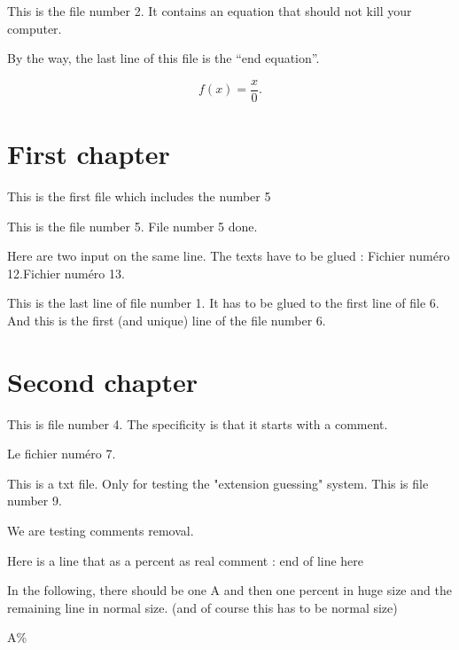 \documentclass[a4paper,oneside,11pt]{book}
\begin{document}
 

 


%
    This is the file number 2. It contains an equation that should not kill your computer.

By the way, the last line of this file is the ``end equation''.

\begin{equation}
    f(x)=\frac{ x }{ 0 }.
\end{equation}
  

\tableofcontents

\chapter{First chapter}
This is the first file which includes the number 5

This is the file number 5.      %
File number 5 done. 

Here are two input on the same line. The texts have to be glued :
Fichier numéro 12.Fichier numéro 13.

This is the last line of file number 1. It has to be glued to the first line of file 6.
And this is the first (and unique) line of the file number 6.

\chapter{Second chapter}
%
This is file number 4. The specificity is that it starts with a comment.


Le fichier numéro 7.


This is a txt file. Only for testing the "extension guessing" system.
This is file number 9.

We are testing comments removal. 

Here is a line that as a percent as real comment : end of line here%

In the following, there should be one A and then one percent in huge size and the remaining line in normal size. (and of course this has to be normal size)

\huge

A\% 
\end{document}
